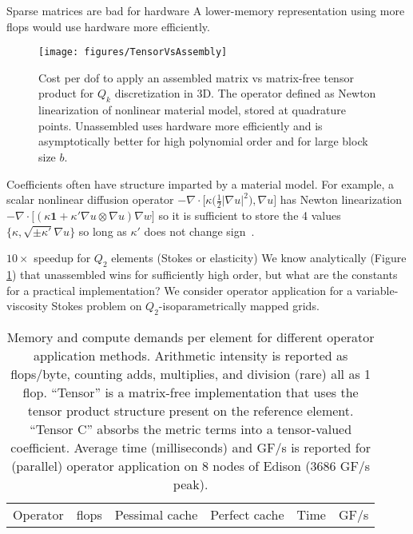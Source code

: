 \documentclass[final,t]{beamer}
\newcommand{\abs}[1]{\left\lvert #1 \right\rvert}
\begin{document}
\begin{frame}{}
\begin{columns}
\begin{column}{0.48\textwidth}
\begin{block}{Sparse matrices are bad for hardware}
        A lower-memory representation using more flops would use hardware more efficiently.
        \begin{figure}
          \centering
          \texttt{[image: figures/TensorVsAssembly]}
          \caption{Cost per dof to apply an assembled matrix vs matrix-free tensor product for $Q_k$ discretization in 3D.
            The operator defined as Newton linearization of nonlinear material model, stored at quadrature points.
            Unassembled uses hardware more efficiently and is asymptotically better for high polynomial order and for large block size $b$.}\label{fig:tensorvsassembly}
        \end{figure}
        Coefficients often have structure imparted by a material model.
        For example, a scalar nonlinear diffusion operator $-\nabla\cdot\Big[\kappa\big(\frac 1 2 \abs{\nabla u}^2\big),\nabla u\Big]$ has Newton linearization $-\nabla\cdot\Big[(\kappa\bm 1 + \kappa' \nabla u \otimes \nabla u) \nabla w\Big]$ so it is sufficient to store the 4 values $\{\kappa, \sqrt{\pm \kappa'}\nabla u\}$ so long as $\kappa'$ does not change sign~\cite{brown2010ens}.
      \end{block}
      \vspace{-2.2em}
      \begin{block}{$10\times$ speedup for $Q_2$ elements (Stokes or elasticity)}
        We know analytically (Figure \ref{fig:tensorvsassembly}) that unassembled wins for sufficiently high order, but what are the constants for a practical implementation?
        We consider operator application for a variable-viscosity Stokes problem on $Q_2$-isoparametrically mapped grids.
        \begin{table}
          \centering\caption{Memory and compute demands per element for different operator application methods.
            Arithmetic intensity is reported as flops/byte, counting adds, multiplies, and division (rare) all as 1 flop.
            ``Tensor'' is a matrix-free implementation that uses the tensor product structure present on the reference element.
            ``Tensor C'' absorbs the metric terms into a tensor-valued coefficient.
            Average time (milliseconds) and GF/s is reported for (parallel) operator application on 8 nodes of Edison (3686 GF/s peak).
          }\label{tab:intensity}
          \begin{tabular}{lrrrrrrr}
            \toprule
            Operator & flops & \multicolumn{2}{c}{Pessimal cache} & \multicolumn{2}{c}{Perfect cache} & Time & GF/s \\

\end{tabular}
\end{table}
\end{block}
\end{column}
\end{columns}
\end{frame}
\end{document}
